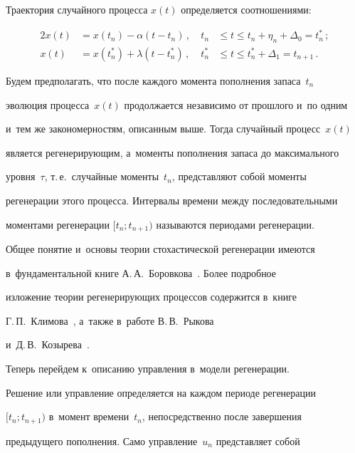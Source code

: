   

  Траектория случайного процесса $x(t)$ определяется соотношениями:

  \begin{alignat*}{2}

  x(t)&=x\left(t_n\right)-\alpha \left(t-t_n\right)\,, &\ t_n& \leq t\leq 

t_n+\eta_n+\Delta_0=t_n^*\,;\\

  x(t) &= x\left( t_n^*\right)+\lambda\left(t-t_n^*\right)\,, &\ t_n^* &\leq t\leq 

t_n^*+\Delta_1=t_{n+1}\,.

  \end{alignat*}

  

  Будем предполагать, что после каждого момента пополнения запаса~$t_n$ 

эволюция процесса~$x(t)$ продолжается независимо от прошлого и~по одним 

и~тем же закономерностям, описанным выше. Тогда случайный процесс~$x(t)$ 

является регенерирующим, а~моменты пополнения запаса до максимального 

уровня~$\tau$, т.\,е.\ случайные моменты~$t_n$, представляют собой моменты 

регенерации этого процесса. Интервалы времени между последовательными 

моментами регенерации $[t_n;t_{n+1})$ называются периодами регенерации.

  

  Общее понятие и~основы теории стохастической регенерации имеются 

в~фундаментальной книге А.\,А.~Боровкова~\cite{12-sh}. Более по\-дроб\-ное 

изложение теории регенерирующих процессов содержится в~книге 

Г.\,П.~Климова~\cite{13-sh}, а~также в~работе В.\,В.~Рыкова 

и~Д.\,В.~Козырева~\cite{14-sh}.

  

  Теперь перейдем к~описанию управления в~модели регенерации.

  

  Решение или управление определяется на каждом периоде регенерации 

$[t_n;t_{n+1})$ в~момент времени~$t_n$, непосредственно после завершения 

предыдущего пополнения. Само управление~$u_n$ представляет собой 

